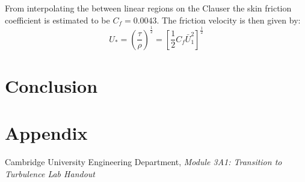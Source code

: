 \documentclass{article}
\begin{document}





From interpolating the between linear regions on the Clauser the skin friction coefficient is estimated to be $C_f = 0.0043$.
The friction velocity is then given by:
\begin{equation}
    U_* = \left( \frac{\tau}{\rho} \right)^{\frac{1}{2}} = \left[ \frac{1}{2}C_f \bar{ U}_1^2 \right]^{\frac{1}{2}}
\end{equation}



\section{Conclusion}



\section{Appendix}

\begin{thebibliography}{9}
    Cambridge University Engineering Department, \textit{Module 3A1: Transition to Turbulence Lab Handout}
\end{thebibliography}
\end{document}
